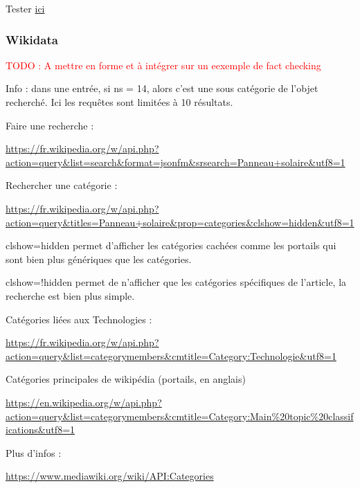 \documentclass[12pt]{article}
\newcommand\todo[1]{\textcolor{red}{TODO : #1}}
\begin{document}
Tester \href{http://fr.dbpedia.org/sparql?default-graph-uri=&query=PREFIX+dbr\%3A+\%3Chttp\%3A\%2F\%2Fdbpedia.org\%2Fresource\%2F\%3E\%0D\%0APREFIX++dct\%3A++\%3Chttp\%3A\%2F\%2Fpurl.org\%2Fdc\%2Fterms\%2F\%3E+\%0D\%0A\%0D\%0Aselect+\%3Fcategorie\%2C+\%28COUNT\%28\%3Fresult\%29+as+\%3FnumberResult\%29+\%0D\%0Awhere+\%7B\%0D\%0A+++\%3Fresult+dct\%3Asubject+\%3Fcategorie.\%0D\%0A+++\%3Fsearch+rdfs\%3Alabel+\%22Voiture\%22\%40fr+.\%0D\%0A+++\%3Fsearch+\%3Chttp\%3A\%2F\%2Fdbpedia.org\%2Fontology\%2FwikiPageWikiLink\%3E+\%0D\%0A+++\%3Fcategorie\%0D\%0A\%7D+ORDER+BY+\%3FnumberResult\%0D\%0ALIMIT+1000&format=text\%2Fhtml&timeout=0&debug=on}{ici}

\subsubsection{Wikidata}

\todo{A mettre en forme et à intégrer sur un eexemple de fact checking}

Info : dans une entrée, si ns = 14, alors c'est une sous catégorie de l'objet recherché. Ici les requêtes sont limitées à 10 résultats.

Faire une recherche : 

\url{https://fr.wikipedia.org/w/api.php?action=query&list=search&format=jsonfm&srsearch=Panneau+solaire&utf8=1}

Rechercher une catégorie :

\url{https://fr.wikipedia.org/w/api.php?action=query&titles=Panneau+solaire&prop=categories&clshow=hidden&utf8=1}

clshow=hidden permet d'afficher les catégories cachées comme les portails qui sont bien plus génériques que les catégories.

clshow=!hidden permet de n'afficher que les catégories spécifiques de l'article, la recherche est bien plus simple.

Catégories liées aux Technologies :

\url{https://fr.wikipedia.org/w/api.php?action=query&list=categorymembers&cmtitle=Category:Technologie&utf8=1}

Catégories principales de wikipédia (portails, en anglais)

\url{https://en.wikipedia.org/w/api.php?action=query&list=categorymembers&cmtitle=Category:Main%20topic%20classifications&utf8=1}

Plus d'infos : 

\url{https://www.mediawiki.org/wiki/API:Categories}
\end{document}
